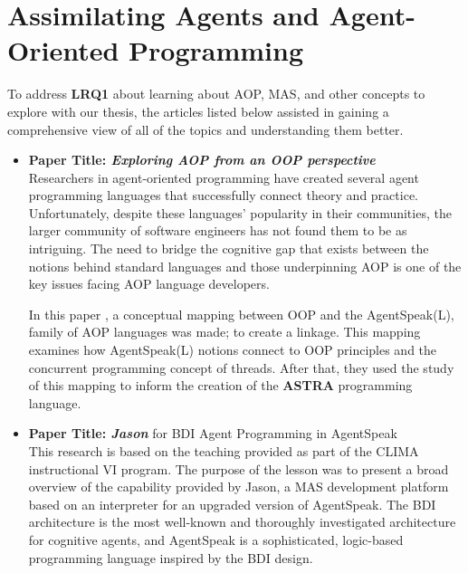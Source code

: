 \section{Assimilating Agents and Agent-Oriented Programming}

To address \textbf{LRQ1} about learning about \ac{AOP}, \ac{MAS}, and other concepts to explore with our thesis, the articles listed below assisted in gaining a comprehensive view of all of the topics and understanding them better.

\begin{itemize}[label={}]
\item \textbf{Paper Title: \textit{Exploring \ac{AOP} from an \ac{OOP} perspective}}\\

Researchers in agent-oriented programming have created several agent programming languages that successfully connect theory and practice. Unfortunately, despite these languages' popularity in their communities, the larger community of software engineers has not found them to be as intriguing. The need to bridge the cognitive gap that exists between the notions behind standard languages and those underpinning \ac{AOP} is one of the key issues facing \ac{AOP} language developers. 
 
 \vspace{.5cm}
 
In this paper \cite{astra}, a conceptual mapping between \ac{OOP} and the AgentSpeak(L), family of \ac{AOP} languages was made; to create a linkage. This mapping examines how AgentSpeak(L) notions connect to \ac{OOP} principles and the concurrent programming concept of threads. After that, they used the study of this mapping to inform the creation of the \textbf{ASTRA} programming language.

 \vspace{.5cm}
 
\item \textbf{Paper Title: \textit{Jason}} for \ac{BDI} Agent Programming in AgentSpeak \\

This research \cite{jasonBDI} is based on the teaching provided as part of the CLIMA instructional VI program. The purpose of the lesson was to present a broad overview of the capability provided by Jason, a \ac{MAS} development platform based on an interpreter for an upgraded version of AgentSpeak. The \ac{BDI} architecture is the most well-known and thoroughly investigated architecture for cognitive agents, and AgentSpeak is a sophisticated, logic-based programming language inspired by the \ac{BDI} design.


\end{itemize}
